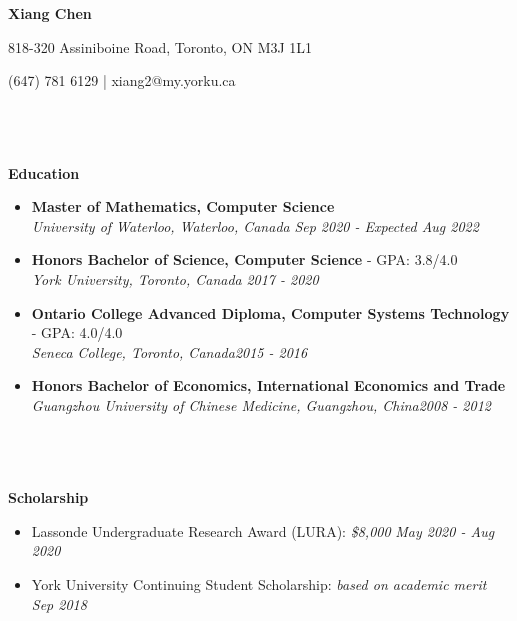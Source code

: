 \documentclass[a4paper,10pt,titlepage]{article}
\begin{document}
\centerline {\textbf {\LARGE Xiang Chen}}
\centerline {818-320 Assiniboine Road, Toronto, ON M3J 1L1}
\centerline {(647) 781 6129 \hspace*{1mm}|\hspace*{1mm} xiang2@my.yorku.ca}
~\\
\leftline{\rule{\linewidth}{0.1mm}}
~\\
\\
\textbf {\Large Education}
\begin{itemize}%
	\item {\bf Master of Mathematics, Computer Science}
	\\\emph {University of Waterloo, Waterloo, Canada} {\hfill \emph{Sep 2020 - Expected Aug 2022}}
	\item {\bf Honors Bachelor of Science, Computer Science}     - GPA: 3.8/4.0
	\\\emph {York University, Toronto, Canada} {\hfill \emph{2017 - 2020}}
	\item {\bf Ontario College Advanced Diploma, Computer Systems Technology}     - GPA: 4.0/4.0
	\\\emph {Seneca College, Toronto, Canada}{\hfill \emph{2015 - 2016}}
	\item {\bf Honors Bachelor of Economics, International Economics and Trade}
	\\\emph  {Guangzhou University of Chinese Medicine, Guangzhou, China}{\hfill \emph{2008 - 2012}}
\end{itemize}
~\\
\leftline{\rule{\linewidth}{0.1mm}}
~\\
\\
\textbf {\Large Scholarship}
\begin{itemize}%
	\item Lassonde Undergraduate Research Award (LURA): \emph {\$8,000} {\hfill \emph {May 2020 - Aug 2020}}
	\item York University Continuing Student Scholarship: \emph {based on academic merit} {\hfill \emph {Sep 2018}}
\end{itemize}
\end{document}
